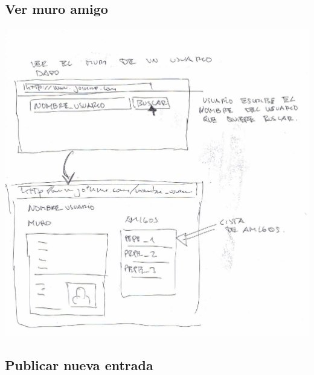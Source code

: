 \documentclass[12pt, a4paper, titlepage]{article}
\begin{document}
\subsection{Ver muro amigo}


	\begin{center}
		\includegraphics[scale=0.5]{Imagenes/ver_muro_amigo}
	\end{center}


\subsection{Publicar nueva entrada}
\end{document}
